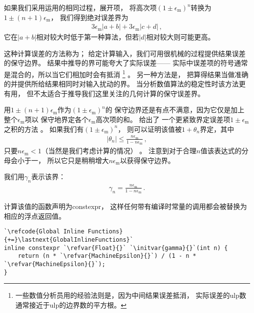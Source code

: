 如果我们采用运用的相同过程，展开项，
将高次项$(1\pm\epsilon_{\mathrm{m}})^n$转换为$1\pm(n+1)\epsilon_{\mathrm{m}}$，
我们得到绝对误差界为
\begin{align*}
    3\epsilon_{\mathrm{m}}|a+b|+3\epsilon_{\mathrm{m}}|c+d|\, ,
\end{align*}
它在$|a+b|$相对较大时低于第一种算法，但若$|d|$相对较大则可能更高。

这种计算误差的方法称为；
给定计算输入，我们可用很机械的过程提供结果误差的保守边界。
结果中推导的界可能夸大了实际误差——
实际中误差项的符号通常是混合的，所以当它们相加时会有抵消
\footnote{一些数值分析员用的经验法则是，因为中间结果误差抵消，
    实际误差的ulp数通常接近于ulp的边界数的平方根。}
。
另一种方法是，
把算得结果当做准确的并提供所给结果相同时对输入扰动的界。
当分析数值算法的稳定性时该方法更有用，
但不太适合于推导我们这里关注的几何计算的保守误差界。

用$1\pm(n+1)\epsilon_{\mathrm{m}}$作为$(1\pm\epsilon_{\mathrm{m}})^n$的
保守边界还是有点不满意，因为它仅是加上整个$\epsilon_{\mathrm{m}}$项以
保守地界定各个$\epsilon_{\mathrm{m}}$高次项的和。
\citet[3.1节]{doi:10.1137/1.9780898718027}给出了
一个更紧致界定误差项$1\pm\epsilon_{\mathrm{m}}$之积的方法
。
如果我们有$(1\pm\epsilon_{\mathrm{m}})^n$，
则可以证明该值被$1+\theta_n$界定，其中
\begin{align}\label{eq:3.11}
    |\theta_n|\le\frac{n\epsilon_{\mathrm{m}}}{1-n\epsilon_{\mathrm{m}}}\, ,
\end{align}
只要$n\epsilon_{\mathrm{m}}<1$（当然是我们考虑计算的情况）
。
注意到对于合理$n$值该表达式的分母会小于一，
所以它只是稍稍增大$n\epsilon_{\mathrm{m}}$以获得保守边界。

我们用$\gamma_n$表示该界：
\begin{align*}
    \gamma_n=\frac{n\epsilon_{\mathrm{m}}}{1-n\epsilon_{\mathrm{m}}}\, .
\end{align*}

计算该值的函数声明为{\ttfamily constexpr}，
这样任何带有编译时常量的调用都会被替换为相应的浮点返回值。
\begin{lstlisting}
`\refcode{Global Inline Functions}{+=}\lastnext{GlobalInlineFunctions}`
inline constexpr `\refvar{Float}{}` `\initvar{gamma}{}`(int n) {
    return (n * `\refvar{MachineEpsilon}{}`) / (1 - n * `\refvar{MachineEpsilon}{}`);
}
\end{lstlisting}

